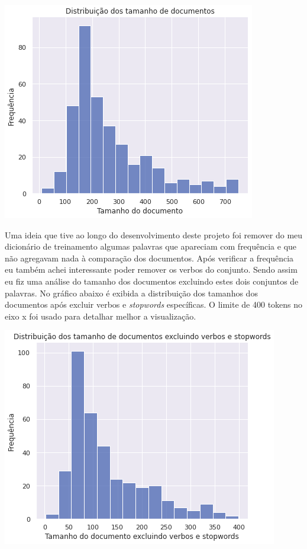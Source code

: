\includegraphics[scale=0.75]{explore/resources/tamanho_documentos_max750.png}

Uma ideia que tive ao longo do desenvolvimento deste projeto foi remover do meu dicionário de treinamento algumas palavras que apareciam
com frequência e que não agregavam nada à comparação dos documentos. Após verificar a frequência eu também achei interessante poder remover 
os verbos do conjunto. Sendo assim eu fiz uma análise do tamanho dos documentos excluindo estes dois conjuntos de palavras. No gráfico 
abaixo é exibida a distribuição dos tamanhos dos documentos após excluir verbos e \textit{stopwords} específicas. O limite de 400
tokens no eixo x foi usado para detalhar melhor a visualização.

\includegraphics[scale=0.75]{explore/resources/tamanho_documentos_nao_verbo_sw_max400.png}

